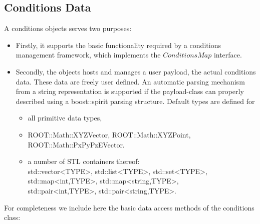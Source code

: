 \documentclass[10pt,a4paper]{article}
\begin{document}
\subsection{Conditions Data}
\label{subsec:ddcond-conditions-data}

\noindent
A conditions objects serves two purposes:
\begin{itemize}
\item Firstly, it supports the basic functionality required by a 
      conditions management framework, which implements the $ConditionsMap$ 
      interface.
\item Secondly, the objects hosts and manages a user payload, the actual
      conditions data. These data are freely user defined. An automatic 
      parsing mechanism from a string representation is supported if the 
      payload-class can properly described using a boost::spirit
      parsing structure. Default types are defined for 
    \begin{itemize}
        \item all primitive data types, 
        \item ROOT::Math::XYZVector, ROOT::Math::XYZPoint, ROOT::Math::PxPyPzEVector.
        \item a number of STL containers thereof:\\
                std::vector\textless TYPE\textgreater, 
                std::list\textless TYPE\textgreater,
                std::set\textless TYPE\textgreater,\\
                std::map\textless int,TYPE\textgreater,
                std::map\textless string,TYPE\textgreater,\\
                std::pair\textless int,TYPE\textgreater,
                std::pair\textless string,TYPE\textgreater.
    \end{itemize}
\end{itemize}
For completeness we include here the basic data access methods of the conditions
class:
\vspace{-0.2cm}
\end{document}
